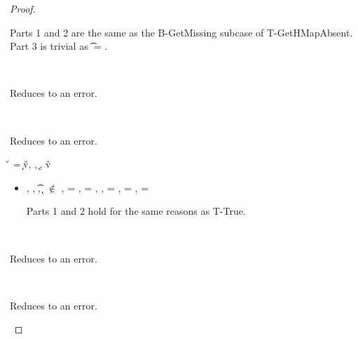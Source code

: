 \begin{lemma}
\begin{proof}
\begin{case}[B-GetMissing]
\begin{itemize}
\begin{subcase}[T-GetHMapPartialDefault]
         Parts 1 and 2 are the same as the B-GetMissing subcase of T-GetHMapAbsent.
         Part 3 is trivial as \t{} = \Top.
      \end{subcase}
  \end{itemize}
\end{case}

\begin{case}[BE-Get1]
  \ 

  Reduces to an error.
\end{case}

\begin{case}[BE-Get2]
  \ 

  Reduces to an error.
\end{case}

\begin{case}[B-Assoc]
        \v{} = 
        {
                {\k{}}{\v{v}}},
        \opsem {\openv{}}
        {} {},
        \opsem {\openv{}} {} {\k{}},
        \opsem {\openv{}} {} {\v{v}}

  \begin{itemize}
    \item[]
      \begin{subcase}[T-AssocHMap]
  \judgementtworewrite {\propenv{}} {} {\HMapgeneric {\mandatory{}} {\absent}} {},
  \judgementtworewrite {\propenv{}} {} {\Value{\k{}}}{},
  \judgementtworewrite {\propenv{}} {} {\t{}}{},
  {\k{}} $\not\in$ {\absent{}},
  \ep{} = { {} {}},
  \e{} = { {} {}},
  \issubtypein{}{\HMapgeneric {\extendmandatoryset {\mandatory{}}{\k{}}{\t{}}} {\absent}}{\t{}},
  \thenprop{\prop{}} = {\topprop{}},
  \elseprop{\prop{}} = {\botprop{}},
  \object{} = \emptyobject{}

        Parts 1 and 2 hold for the same reasons as T-True.
      \end{subcase}
  \end{itemize}
\end{case}

\begin{case}[BE-Assoc1]
  \ 

  Reduces to an error.
\end{case}

\begin{case}[BE-Assoc2]
  \ 

  Reduces to an error.
\end{case}


\end{proof}
\end{lemma}

